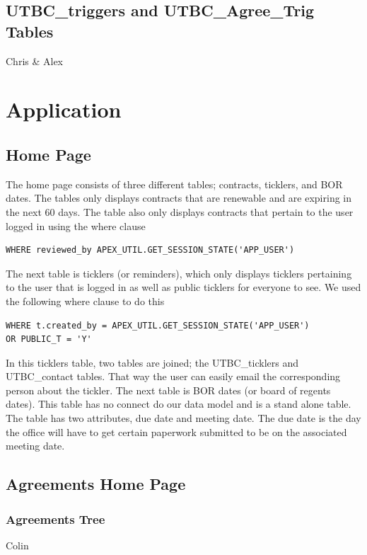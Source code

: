 \documentclass{report}
\begin{document}
\section{UTBC\_triggers and UTBC\_Agree\_Trig Tables}
Chris & Alex

\chapter{Application}

\section{Home Page}
The home page consists of three different tables; contracts, ticklers, and BOR dates. The tables only displays contracts that are renewable and are expiring in the next 60 days. The table also only displays contracts that pertain to the user logged in using the where clause

\begin{lstlisting}[caption=Contracts table where clause for user]
WHERE reviewed_by APEX_UTIL.GET_SESSION_STATE('APP_USER')
\end{lstlisting}

The next table is ticklers (or reminders), which only displays ticklers pertaining to the user that is logged in as well as public ticklers for everyone to see. We used the following where clause to do this

\begin{lstlisting}[caption=Tickler table where clause]
WHERE t.created_by = APEX_UTIL.GET_SESSION_STATE('APP_USER')
OR PUBLIC_T = 'Y'
\end{lstlisting}

In this ticklers table, two tables are joined; the UTBC\_ticklers and UTBC\_contact tables. That way the user can easily email the corresponding person about the tickler. 
The next table is BOR dates (or board of regents dates). This table has no connect do our data model and is a stand alone table. The table has two attributes, due date and meeting date. The due date is the day the office will have to get certain paperwork submitted to be on the associated meeting date.

\section{Agreements Home Page}

\subsection{Agreements Tree}
Colin
\end{document}
